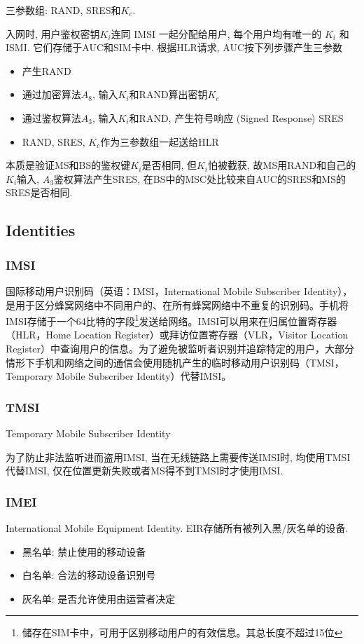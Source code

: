 \documentclass[a4paper]{report}
\begin{document}
三参数组: RAND, SRES和$K_c$. 

入网时, 用户鉴权密钥$K_i$连同 IMSI 一起分配给用户, 每个用户均有唯一的 $K_i$ 和 ISMI. 它们存储于AUC和SIM卡中. 根据HLR请求, AUC按下列步骤产生三参数
\begin{itemize}
	\item 产生RAND
	\item 通过加密算法$A_8$, 输入$K_i$和RAND算出密钥$K_c$
	\item 通过鉴权算法$A_3$, 输入$K_i$和RAND, 产生符号响应 (Signed Response) SRES
	\item RAND, SRES, $K_c$作为三参数组一起送给HLR
\end{itemize}
本质是验证MS和BS的鉴权键$K_i$是否相同, 但$K_i$怕被截获, 故MS用RAND和自己的$K_i$输入, $A_3$鉴权算法产生SRES, 在BS中的MSC处比较来自AUC的SRES和MS的SRES是否相同. 

\subsection{Identities}
\subsubsection{IMSI}
国际移动用户识别码（英语：IMSI，International Mobile Subscriber Identity），是用于区分蜂窝网络中不同用户的、在所有蜂窝网络中不重复的识别码。手机将IMSI存储于一个64比特的字段\footnote{储存在SIM卡中，可用于区别移动用户的有效信息。其总长度不超过15位}发送给网络。IMSI可以用来在归属位置寄存器（HLR，Home Location Register）或拜访位置寄存器（VLR，Visitor Location Register）中查询用户的信息。为了避免被监听者识别并追踪特定的用户，大部分情形下手机和网络之间的通信会使用随机产生的临时移动用户识别码（TMSI，Temporary Mobile Subscriber Identity）代替IMSI。
\subsubsection{TMSI}
Temporary Mobile Subscriber Identity

为了防止非法监听进而盗用IMSI, 当在无线链路上需要传送IMSI时, 均使用TMSI代替IMSI, 仅在位置更新失败或者MS得不到TMSI时才使用IMSI. 
\subsubsection{IMEI}
International Mobile Equipment Identity. EIR存储所有被列入黑/灰名单的设备. 

\begin{itemize}
	\item 黑名单: 禁止使用的移动设备
	\item 白名单: 合法的移动设备识别号
	\item 灰名单: 是否允许使用由运营者决定
\end{itemize}
\end{document}
